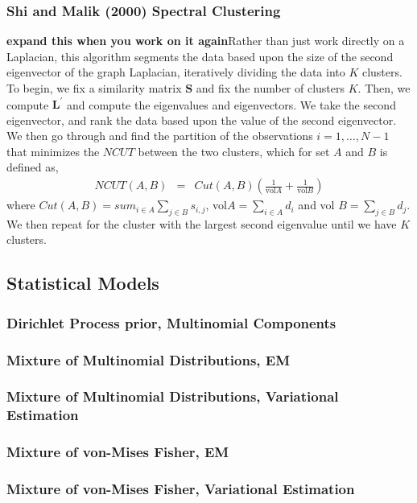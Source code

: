 \documentclass[11pt,letterpaper]{article}
\numberwithin{equation}{section}
\begin{document}
\subsubsection{Shi and Malik (2000) Spectral Clustering}
\textbf{expand this when you work on it again}Rather than just work
directly on a Laplacian, this algorithm segments the data based upon
the size of the second eigenvector of the graph Laplacian,
iteratively dividing the data into $K$ clusters.  To begin, we fix a
similarity matrix $\boldsymbol{S}$ and fix the number of clusters
$K$.  Then, we compute $\boldsymbol{L}^{'}$ and compute the
eigenvalues and eigenvectors. We take the second eigenvector, and
rank the data based upon the value of the second eigenvector. We
then go through and find the partition of the observations $i=
1,\hdots, N-1$ that minimizes the $NCUT$ between the two clusters,
which for set $A$ and $B$ is defined as,
\begin{eqnarray}
NCUT(A, B) & = & Cut(A, B) \left(\frac{1}{\text{vol} A } +
\frac{1}{\text{vol} B} \right) \nonumber
\end{eqnarray}
where $Cut(A,B) = sum_{i \in A}\sum_{j \in B} s_{i,j}$, vol$A =
\sum_{i \in A} d_i$ and vol $B = \sum_{j \in B} d_j$.  We then
repeat for the cluster with the largest second eigenvalue until we
have $K$ clusters.

\subsection{Statistical Models}

\subsubsection{Dirichlet Process prior, Multinomial Components}
\subsubsection{Mixture of Multinomial Distributions, EM}
\subsubsection{Mixture of Multinomial Distributions, Variational Estimation}
\subsubsection{Mixture of von-Mises Fisher, EM}
\subsubsection{Mixture of von-Mises Fisher, Variational Estimation}
\end{document}
